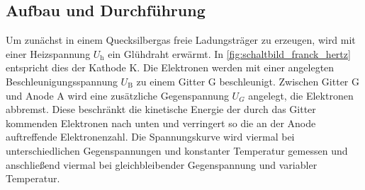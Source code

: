 \subsection{Aufbau und Durchführung}
Um zunächst in einem Quecksilbergas freie Ladungsträger zu erzeugen, wird mit einer 
Heizspannung $U_\mathrm h$ ein Glühdraht erwärmt. In \cref{fig:schaltbild_franck_hertz} 
entspricht dies der Kathode K. Die Elektronen werden mit einer angelegten Beschleunigungsspannung
$U_\mathrm B$ zu einem Gitter G beschleunigt. 
Zwischen Gitter G und Anode A wird eine zusätzliche Gegenspannung $U_G$ angelegt, die Elektronen 
abbremst. Diese beschränkt die kinetische Energie der durch das Gitter kommenden
Elektronen nach unten und verringert so die an der Anode auftreffende Elektronenzahl.
Die Spannungskurve wird viermal bei unterschiedlichen Gegenspannungen und konstanter Temperatur 
gemessen und anschließend viermal bei gleichbleibender Gegenspannung und variabler 
Temperatur.

